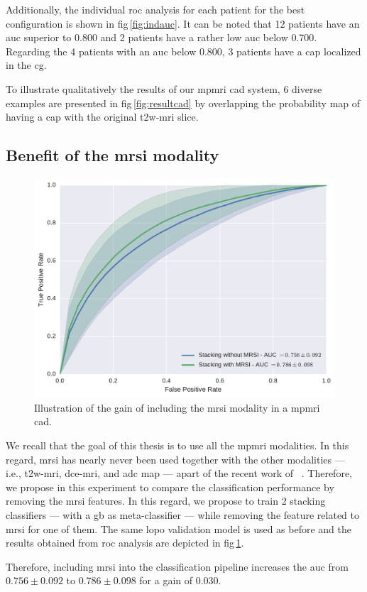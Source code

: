 Additionally, the individual \ac{roc} analysis for each patient for the best configuration is shown in \acs{fig}\,\ref{fig:indauc}.
It can be noted that 12 patients have an \ac{auc} superior to $0.800$ and 2 patients have a rather low \ac{auc} below $0.700$.
Regarding the 4 patients with an \ac{auc} below $0.800$, 3 patients have a \ac{cap} localized in the \ac{cg}.

To illustrate qualitatively the results of our \ac{mpmri} \ac{cad} system, 6 diverse examples are presented in \acs{fig}\,\ref{fig:resultcad} by overlapping the probability map of having a \ac{cap} with the original \ac{t2w}-\ac{mri} slice.

\subsection{Benefit of the \acs*{mrsi} modality}\label{subsec:chp6:exp-res:Ex5}

\begin{figure}
  \centering
  \includegraphics[width=0.7\linewidth]{content/figures/exp-6/stacking_wt_mrsi.pdf}
  \caption{Illustration of the gain of including the \acs*{mrsi} modality in a \acs*{mpmri} \acs*{cad}.}
  \label{fig:resmrsigain}
\end{figure}

We recall that the goal of this thesis is to use all the \ac{mpmri} modalities.
In this regard, \ac{mrsi} has nearly never been used together with the other modalities --- i.e., \ac{t2w}-\ac{mri}, \ac{dce}-\ac{mri}, and \ac{adc} map --- apart of the recent work of \citeauthor{trigui2017automatic}~\cite{trigui2016classification,trigui2017automatic}.
Therefore, we propose in this experiment to compare the classification performance by removing the \ac{mrsi} features.
In this regard, we propose to train 2 stacking classifiers --- with a \ac{gb} as meta-classifier --- while removing the feature related to \ac{mrsi} for one of them.
The same \ac{lopo} validation model is used as before and the results obtained from \ac{roc} analysis are depicted in \acs{fig}\,\ref{fig:resmrsigain}.

Therefore, including \ac{mrsi} into the classification pipeline increases the \ac{auc} from $0.756 \pm 0.092$ to $0.786 \pm 0.098$ for a gain of $0.030$.
